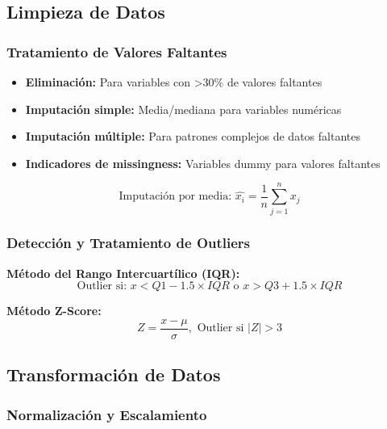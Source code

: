 \subsection{Limpieza de Datos}

\subsubsection{Tratamiento de Valores Faltantes}

\begin{itemize}
    \item \textbf{Eliminación:} Para variables con >30\% de valores faltantes
    \item \textbf{Imputación simple:} Media/mediana para variables numéricas
    \item \textbf{Imputación múltiple:} Para patrones complejos de datos faltantes
    \item \textbf{Indicadores de missingness:} Variables dummy para valores faltantes
\end{itemize}

\begin{equation}
\text{Imputación por media: } \hat{x_i} = \frac{1}{n}\sum_{j=1}^{n} x_j
\label{eq:imputacion_media}
\end{equation}

\subsubsection{Detección y Tratamiento de Outliers}

\textbf{Método del Rango Intercuartílico (IQR):}
\begin{equation}
\text{Outlier si: } x < Q1 - 1.5 \times IQR \text{ o } x > Q3 + 1.5 \times IQR
\label{eq:outlier_iqr}
\end{equation}

\textbf{Método Z-Score:}
\begin{equation}
Z = \frac{x - \mu}{\sigma}, \text{ Outlier si } |Z| > 3
\label{eq:outlier_zscore}
\end{equation}

\subsection{Transformación de Datos}

\subsubsection{Normalización y Escalamiento}

